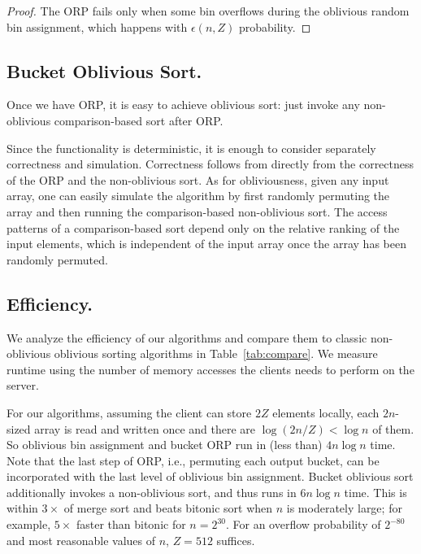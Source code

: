 \begin{proof}
The ORP fails only when some bin overflows during the oblivious random bin assignment, which happens with $\epsilon(n,Z)$ probability.
\end{proof}

\subsection{Bucket Oblivious Sort.}
\label{sec:osort}
Once we have ORP, it is easy to achieve oblivious sort: just invoke any non-oblivious comparison-based sort after ORP.

Since the functionality is deterministic, it is enough to consider separately correctness and simulation. Correctness follows from directly from the correctness of the ORP and the non-oblivious sort. As for obliviousness, given any input array, one can easily simulate the algorithm by first randomly permuting the array and then running the comparison-based non-oblivious sort. 
The access patterns of a comparison-based sort depend only on the relative ranking of the input elements, which is independent of the input array once the array has been randomly permuted. 

\subsection{Efficiency.}
\label{sec:efficiency}

We analyze the efficiency of our algorithms and compare them to classic non-oblivious oblivious sorting algorithms in Table~\ref{tab:compare}.
We measure runtime using the number of memory accesses the clients needs to perform on the server.





For our algorithms, assuming the client can store $2Z$ elements locally, each $2n$-sized array is read and written once and there are $\log(2n/Z)<\log n$ of them.
So oblivious bin assignment and bucket ORP run in (less than) $4n\log n$ time.
Note that the last step of ORP, i.e., permuting each output bucket, can be incorporated with the last level of oblivious bin assignment.
Bucket oblivious sort additionally invokes a non-oblivious sort, and thus runs in $6n\log n$ time. 
This is within $3\times$ of merge sort and beats bitonic sort when $n$ is moderately large;
for example, $5\times$ faster than bitonic for $n=2^{30}$.
For an overflow probability of $2^{-80}$ and most reasonable values of $n$, $Z = 512$ suffices. 


